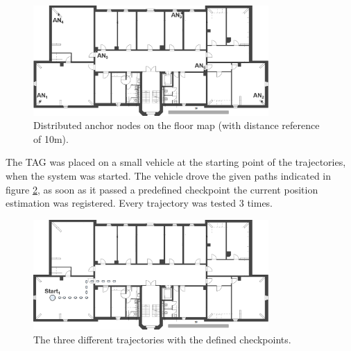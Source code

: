 \begin{figure}[th]
\centering
\includegraphics[width=0.8\textwidth]{Figures/anchor_position}
\decoRule
\caption[Anchor Node Positions]{Distributed anchor nodes on the floor map (with distance reference of 10m).}
\label{fig:anchor_position}
\end{figure}

The TAG was placed on a small vehicle at the starting point of the trajectories, when the system was started. The vehicle drove the given paths indicated in figure \ref{fig:trajectories}, as soon as it passed a predefined checkpoint the current position estimation was registered. Every trajectory was tested 3 times. 

\begin{figure}[th]
\centering
\includegraphics[width=0.8\textwidth]{Figures/trajectories}
\decoRule
\caption[Trajectories]{The three different trajectories with the defined checkpoints.}
\label{fig:trajectories}
\end{figure}